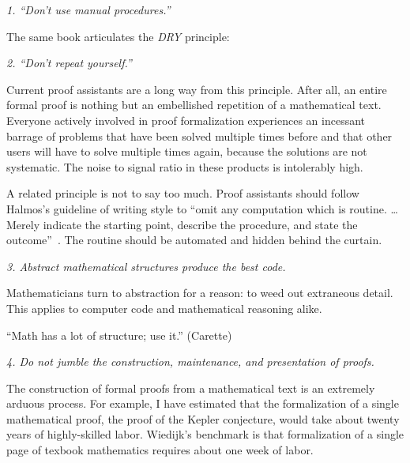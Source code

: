 \documentclass{llncs}
\newcommand{\ring}[1]{\mathbb{#1}}
\begin{document}
\def\princ#1{\smallskip\hfill\break\smallskip\centerline{\it #1\hfill}}

\princ{1. ``Don't use manual procedures.''~\cite{XX}}

  The same book articulates the {\it DRY} principle:
\princ{2. ``Don't repeat yourself.''}

Current proof assistants are a long way from this principle.  After
all, an entire formal proof is nothing but an embellished repetition
of a mathematical text.  Everyone actively involved in proof
formalization experiences an incessant barrage of problems that have
been solved multiple times before and that other users will have to
solve multiple times again, because the solutions are not systematic.
The noise to signal ratio in these products is intolerably high.


A related principle is not to say too much.  
Proof assistants should follow Halmos's guideline of writing style to ``omit
any computation which is routine. \dots Merely indicate the starting point,
describe the procedure, and state the outcome''~\cite{Halmos}.  The routine
should be automated and hidden behind the curtain.

\princ{3. Abstract mathematical 
structures produce the best code.~\cite{XX}} %

Mathematicians  turn to abstraction for a reason: to weed out
extraneous detail.  This applies to computer code and mathematical
reasoning alike.

``Math has a lot of structure; use it.'' (Carette)

\princ{4. Do not jumble the construction, maintenance, and presentation
of proofs.}

The construction of formal proofs from a mathematical text is an extremely
arduous process.  For example, I have estimated that the formalization of a single
mathematical proof, the proof of the Kepler conjecture, would take about twenty
years of highly-skilled labor.  Wiedijk's benchmark is that formalization
of a single page of texbook mathematics requires about one week of labor.
\end{document}
